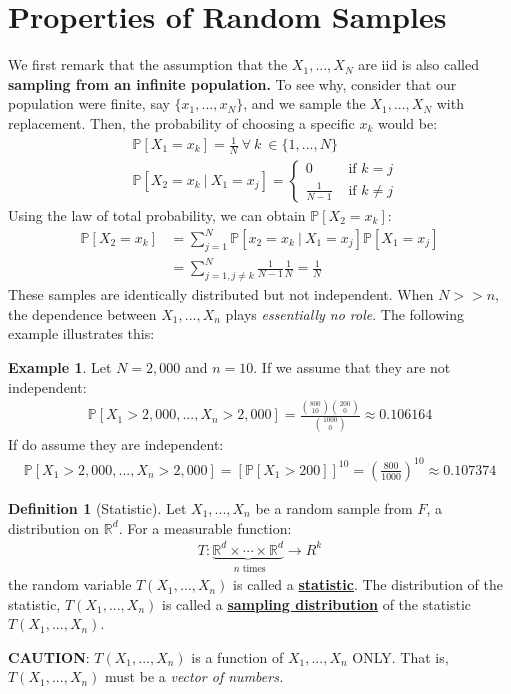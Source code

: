 \documentclass[11pt]{scrartcl}
\newcommand{\R}[0]{\mathbb{R}}
\theoremstyle{definition}
\newtheorem{definition}{Definition}
\newtheorem{ex}{Example}
\theoremstyle{remark}
\newcommand{\dfn}[1]{\textbf{\underline{#1}}}
\newcommand{\pr}[1]{\mathbb{P}\left[#1 \right]}
\newcommand{\stat}[0]{T(X_1, ..., X_n )}
\begin{document}
{\section{ Properties of Random Samples}

We first remark that the assumption that the $X_1, ..., X_N$ are iid is also called \textbf{sampling from an infinite population.} To see why, consider that our population were finite, say $\{ x_1, ..., x_N \}$, and we sample the $X_1,..., X_N$ with replacement. Then, the probability of choosing a specific $x_k$ would be: 
\begin{align*}
		& \pr{ X_1 = x_k } = \frac{1}{N}\ \forall\ k\ \in \{ 1, ..., N \} \\
		& \pr{ X_2 = x_k\ |\ X_1 = x_j } = \begin{cases}
			0 & \text{ if } k = j \\
			\frac{1}{N-1} & \text{ if } k \neq j 
		\end{cases} 
\end{align*}
Using the law of total probability, we can obtain $\pr{X_2 = x_k}$: 
\begin{align*}
	\pr{X_2 = x_k } & = \sum_{j=1}^N \pr{x_2 = x_k\ |\ X_1 = x_j } \pr{X_1 = x_j} \\
		& = \sum_{j=1, j \neq k}^N \frac{1}{N-1	} \frac{1}{N} = \frac{1}{N}
\end{align*}
These samples are identically distributed but not independent. When $N >> n $, the dependence between $X_1, ..., X_n$ plays \emph{essentially no role}. The following example illustrates this: 

\begin{ex} 
Let $N=2,000$ and $n=10$. If we assume that they are not independent: 
\begin{align*}
\pr{X_1 > 2,000 , ... , X_n > 2,000}  =	\frac{\binom{800}{10} \binom{200}{0}}{\binom{1000}{0}} \approx 0.106164 
\end{align*}
If do assume they are independent: 
\begin{align*}
\pr{X_1 > 2,000 , ... , X_n > 2,000} = [\pr{X_1 > 200}]^{10} =  \left( \frac{800}{1000} \right)^{10} \approx 0.107374 	
\end{align*}
\end{ex}

\begin{definition}[Statistic]
	Let $X_1, ..., X_n$ be a random sample from $F$, a distribution on $\R^d$. For a measurable function: 
	\begin{align}
		T: \underbrace{\R^d \times \cdots \times \R^d}_{\text{ $n$ times } } \rightarrow R^k 
	\end{align}
	the random variable $T(X_1, ..., X_n)$ is called a \dfn{statistic}. The distribution of the statistic, $T(X_1,...,X_n)$ is called a \dfn{sampling distribution} of the statistic $\stat$. 
\end{definition}
\textbf{CAUTION}: $\stat$ is a function of $X_1, ..., X_n$ ONLY. That is, $\stat$ must be a \emph{vector of numbers.} 

}
\end{document}

